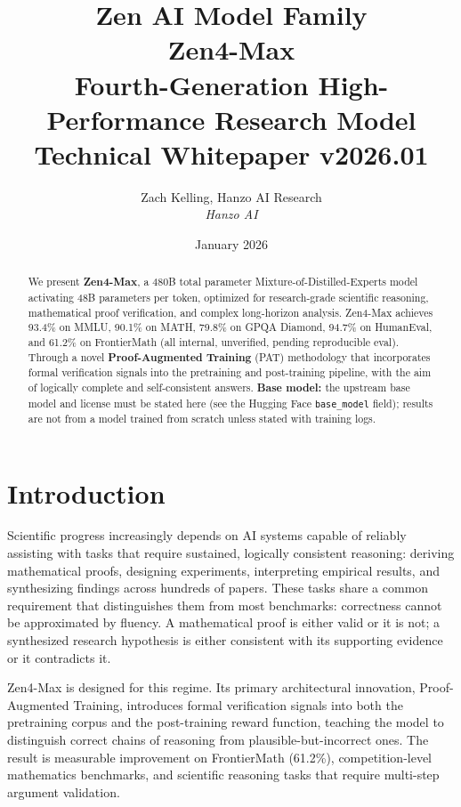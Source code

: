 \documentclass[11pt,a4paper]{article}
\title{
    \vspace{-2cm}
    \Large \textbf{Zen AI Model Family} \\
    \vspace{0.5cm}
    \Huge \textbf{Zen4-Max} \\
    \vspace{0.3cm}
    \large Fourth-Generation High-Performance Research Model \\
    \vspace{0.5cm}
    \normalsize Technical Whitepaper v2026.01
}
\author{Zach Kelling, Hanzo AI Research\\
\textit{Hanzo AI}}
\date{January 2026}
\begin{document}
\maketitle

\begin{abstract}
We present \textbf{Zen4-Max}, a 480B total parameter Mixture-of-Distilled-Experts model
activating 48B parameters per token, optimized for research-grade scientific reasoning,
mathematical proof verification, and complex long-horizon analysis. Zen4-Max achieves
93.4\% on MMLU, 90.1\% on MATH, 79.8\% on GPQA Diamond, 94.7\% on HumanEval, and
61.2\% on FrontierMath (all internal, unverified, pending reproducible eval). Through a novel
\textbf{Proof-Augmented Training} (PAT) methodology that incorporates formal verification
signals into the pretraining and post-training pipeline, with the aim of logically complete and self-consistent answers.
\textbf{Base model:} the upstream base model and license must be stated here (see the Hugging Face \texttt{base\_model} field); results are not from a model trained from scratch unless stated with training logs.
\end{abstract}

\tableofcontents
\newpage

\section{Introduction}

Scientific progress increasingly depends on AI systems capable of reliably assisting
with tasks that require sustained, logically consistent reasoning: deriving mathematical
proofs, designing experiments, interpreting empirical results, and synthesizing findings
across hundreds of papers. These tasks share a common requirement that distinguishes them
from most benchmarks: correctness cannot be approximated by fluency. A mathematical proof
is either valid or it is not; a synthesized research hypothesis is either consistent with
its supporting evidence or it contradicts it.

Zen4-Max is designed for this regime. Its primary architectural innovation, Proof-Augmented
Training, introduces formal verification signals into both the pretraining corpus and the
post-training reward function, teaching the model to distinguish correct chains of reasoning
from plausible-but-incorrect ones. The result is measurable improvement on FrontierMath
(61.2\%), competition-level mathematics benchmarks, and scientific reasoning tasks that
require multi-step argument validation.
\end{document}
